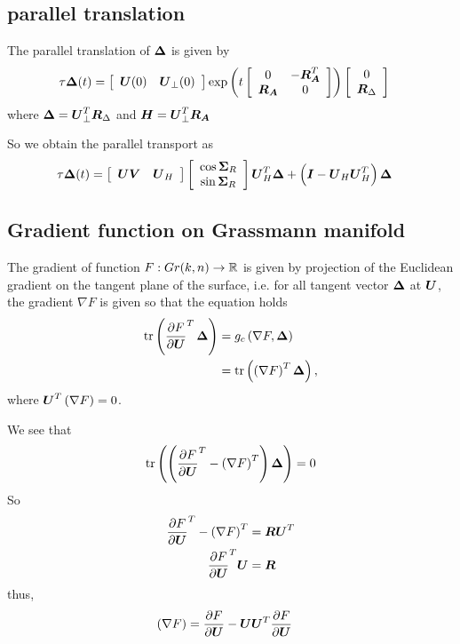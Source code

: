 \documentclass[11pt]{article}
\begin{document}
\subsection{parallel translation}
The parallel translation of $\boldsymbol{\Delta}$ is given by 
\begin{align}
\tau\boldsymbol{\Delta}(t) &=  \left[\begin{array}{cc}
\boldsymbol{U}(0) & \boldsymbol{U}_{\bot}(0)
\end{array}\right]\exp\left(t \left[\begin{array}{cc}
0 & -\boldsymbol{R}_{\boldsymbol{A}}^{T} \\ 
\boldsymbol{R}_{\boldsymbol{A}} & 0
\end{array} \right]\right)\left[\begin{array}{c}
 0\\
 \boldsymbol{R}_{\Delta}
\end{array} \right]
\end{align}
where $\boldsymbol{\Delta} =   \boldsymbol{U}_{\bot}^{T}\boldsymbol{R}_{\Delta}$ and $\boldsymbol{H} = \boldsymbol{U}_{\bot}^{T}\boldsymbol{R}_{\boldsymbol{A}}$

So we obtain the parallel transport as 
\begin{align}
\tau\boldsymbol{\Delta}(t)  &= 
\left[\begin{array}{cc}
\boldsymbol{U}\boldsymbol{V} & \boldsymbol{U}_{H}
\end{array}\right]\left[\begin{array}{c}
\cos\boldsymbol{\Sigma}_{R}\\
\sin\boldsymbol{\Sigma}_{R} 
\end{array}\right]\boldsymbol{U}_{H}^{T}\boldsymbol{\Delta} + \left(\boldsymbol{I} - \boldsymbol{U}_{H}\boldsymbol{U}_{H}^{T}\right)\boldsymbol{\Delta} \label{eqn: parallel_transport_Grass}
\end{align}
\subsection{Gradient function on Grassmann manifold}
The gradient of function $F: Gr(k,n) \rightarrow {\mathbb R}$ is given by projection of the Euclidean gradient on the tangent plane of the surface, i.e.  for all tangent vector $\boldsymbol{\Delta}$ at $\boldsymbol{U}$, the gradient $\nabla F$ is given so that the equation holds  
\begin{align*}
\mathrm{tr}\left(\frac{\partial F}{ \partial \boldsymbol{U}}^{T}\,\boldsymbol{\Delta}  \right) &= g_{c}\left(\nabla F, \boldsymbol{\Delta}\right) \nonumber\\
&= \mathrm{tr}\left(\left(\nabla F\right)^{T}\boldsymbol{\Delta} \right) ,
\end{align*}
where $\boldsymbol{U}^{T}\left(\nabla F\right) = 0$. 

We see that 
\begin{align*}
\mathrm{tr}\left(\left(\frac{\partial F}{ \partial \boldsymbol{U}}^{T} - \left(\nabla F\right)^{T}\right)\boldsymbol{\Delta} \right) &= 0\\
\end{align*}
So
\begin{align*}
\frac{\partial F}{ \partial \boldsymbol{U}}^{T} - \left(\nabla F\right)^{T} &= \boldsymbol{R}\boldsymbol{U}^{T}\\
\frac{\partial F}{ \partial \boldsymbol{U}}^{T}\boldsymbol{U} &= \boldsymbol{R} 
\end{align*}
thus, 
\begin{align}
\left(\nabla F\right) &= \frac{\partial F}{ \partial \boldsymbol{U}}- \boldsymbol{U}\boldsymbol{U}^{T}\frac{\partial F}{ \partial \boldsymbol{U}} \label{eqn: gradient_fun_Grass}
\end{align}
\end{document}
